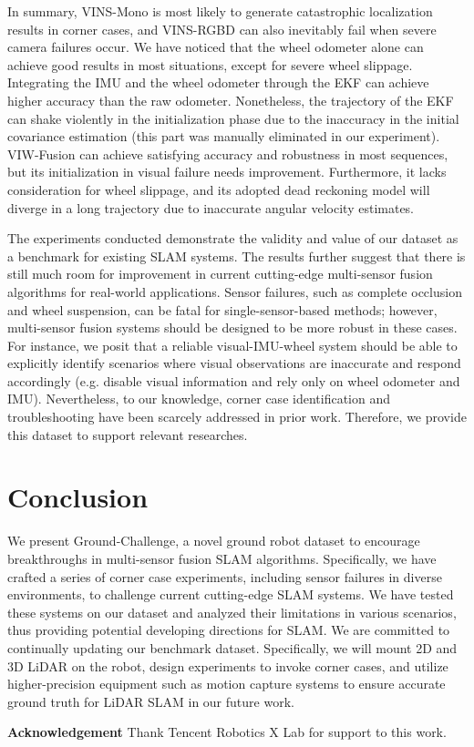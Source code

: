 \documentclass[conference]{IEEEtran}
\begin{document}
In summary, VINS-Mono \cite{qin2018vins} is most likely to generate catastrophic localization results in corner cases, and VINS-RGBD \cite{shan2019rgbd} can also inevitably fail when severe camera failures occur. 
We have noticed that the wheel odometer alone can achieve good results in most situations, except for severe wheel slippage. Integrating the IMU and the wheel odometer through the EKF \cite{ribeiro2004kalman} can achieve higher accuracy than the raw odometer. Nonetheless, the trajectory of the EKF can shake violently in the initialization phase due to the inaccuracy in the initial covariance estimation (this part was manually eliminated in our experiment). VIW-Fusion \cite{Tingda2022VIW} can achieve satisfying accuracy and robustness in most sequences, but its initialization in visual failure needs improvement. Furthermore, it lacks consideration for wheel slippage, and its adopted dead reckoning model will diverge in a long trajectory due to inaccurate angular velocity estimates.

The experiments conducted demonstrate the validity and value of our dataset as a benchmark for existing SLAM systems. The results further suggest that there is still much room for improvement in current cutting-edge multi-sensor fusion algorithms for real-world applications. Sensor failures, such as complete occlusion and wheel suspension, can be fatal for single-sensor-based methods; however, multi-sensor fusion systems should be designed to be more robust in these cases. For instance, we posit that a reliable visual-IMU-wheel system should be able to explicitly identify scenarios where visual observations are inaccurate and respond accordingly (e.g. disable visual information and rely only on wheel odometer and IMU). Nevertheless, to our knowledge, corner case identification and troubleshooting have been scarcely addressed in prior work. Therefore, we provide this dataset to support relevant researches.
	
	
	\section{Conclusion}
We present Ground-Challenge, a novel ground robot dataset to encourage breakthroughs in multi-sensor fusion SLAM algorithms. Specifically, we have crafted a series of corner case experiments, including sensor failures in diverse environments, to challenge current cutting-edge SLAM systems. We have tested these systems on our dataset and analyzed their limitations in various scenarios, thus providing potential developing directions for SLAM. We are committed to continually updating our benchmark dataset. Specifically, we will mount 2D and 3D LiDAR on the robot, design experiments to invoke corner cases, and utilize higher-precision equipment such as motion capture systems to ensure accurate ground truth for LiDAR SLAM in our future work. 

\noindent
\textbf{Acknowledgement}
Thank Tencent Robotics X Lab for support to this work.

\ifCLASSOPTIONcaptionsoff
  \newpage
\fi








\end{document}
